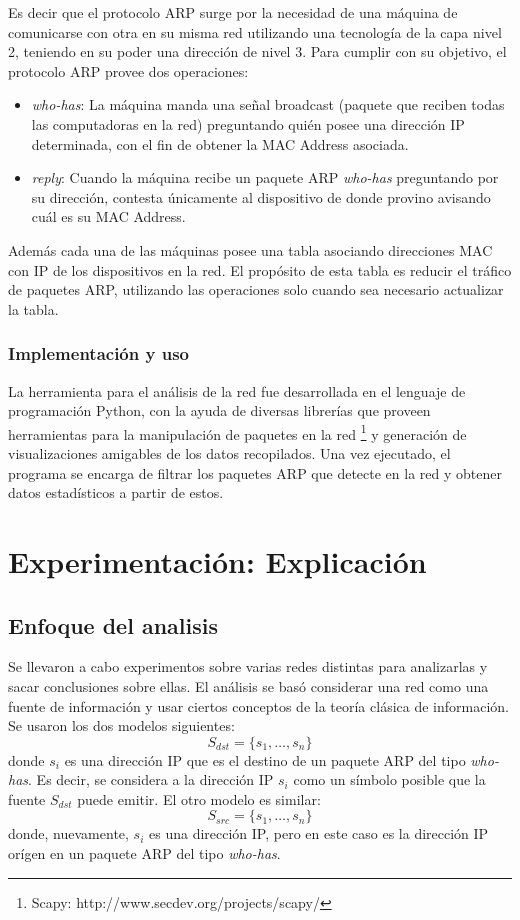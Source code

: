 Es decir que el protocolo ARP surge por la necesidad de una máquina de comunicarse con otra en su misma red utilizando una tecnología de la capa nivel 2, teniendo en su poder una dirección de nivel 3. Para cumplir con su objetivo, el protocolo ARP provee dos operaciones:

\begin{itemize}
    \item \textit{who-has}: La máquina manda una señal broadcast (paquete que reciben todas las computadoras en la red) preguntando quién posee una dirección IP determinada, con el fin de obtener la MAC Address asociada.
    \item \textit{reply}: Cuando la máquina recibe un paquete ARP \textit{who-has} preguntando por su dirección, contesta únicamente al dispositivo de donde provino avisando cuál es su MAC Address.
\end{itemize}

Además cada una de las máquinas posee una tabla asociando direcciones MAC con IP de los dispositivos en la red. El propósito de esta tabla es reducir el tráfico de paquetes ARP, utilizando las operaciones solo cuando sea necesario actualizar la tabla.

\subsubsection{Implementación y uso}
La herramienta para el análisis de la red fue desarrollada en el lenguaje de programación Python, con la ayuda de diversas librerías que proveen herramientas para la manipulación de paquetes en la red \footnote{Scapy: http://www.secdev.org/projects/scapy/} y generación de visualizaciones amigables de los datos recopilados. Una vez ejecutado, el programa se encarga de filtrar los paquetes ARP que detecte en la red y obtener datos estadísticos a partir de estos. 

\section{Experimentación: Explicaci\'on}
\subsection{Enfoque del analisis}
    Se llevaron a cabo experimentos sobre varias redes distintas para analizarlas y sacar conclusiones sobre ellas. El análisis se basó considerar una red como una fuente de información y usar ciertos conceptos de la teoría clásica de información. Se usaron los dos modelos siguientes:
    $$ S_{dst} = \{s_1, \dots, s_n \} $$
    donde $s_i$ es una dirección IP que es el destino de un paquete ARP del tipo \textit{who-has}. Es decir, se considera a la dirección IP $s_i$ como un símbolo posible que la fuente $S_{dst}$ puede emitir. El otro modelo es similar:
    $$ S_{src} = \{s_1, \dots, s_n \} $$
    donde, nuevamente, $s_i$ es una dirección IP, pero en este caso es la dirección IP orígen en un paquete ARP del tipo \textit{who-has}.

